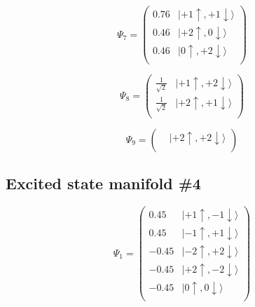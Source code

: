 \documentclass{article}
\begin{document}
\begin{equation}
\Psi_{7} = 
\begin{pmatrix}
      0.76  &  |+1\uparrow , +1\downarrow\rangle  \\
      0.46  &  |+2\uparrow , 0\downarrow\rangle  \\
      0.46  &  |0\uparrow , +2\downarrow\rangle  \\
\end{pmatrix}
\end{equation}

\begin{equation}
\Psi_{8} = 
\begin{pmatrix}
\frac{1}{\sqrt{2}}  &  |+1\uparrow , +2\downarrow\rangle  \\
\frac{1}{\sqrt{2}}  &  |+2\uparrow , +1\downarrow\rangle  \\
\end{pmatrix}
\end{equation}

\begin{equation}
\Psi_{9} = 
\begin{pmatrix}
  &  |+2\uparrow , +2\downarrow\rangle  \\
\end{pmatrix}
\end{equation}



\subsection{Excited state manifold \#4}


\begin{equation}
\Psi_{1} = 
\begin{pmatrix}
      0.45  &  |+1\uparrow , -1\downarrow\rangle  \\
      0.45  &  |-1\uparrow , +1\downarrow\rangle  \\
-      0.45  &  |-2\uparrow , +2\downarrow\rangle  \\
-      0.45  &  |+2\uparrow , -2\downarrow\rangle  \\
-      0.45  &  |0\uparrow , 0\downarrow\rangle  \\
\end{pmatrix}
\end{equation}
\end{document}
